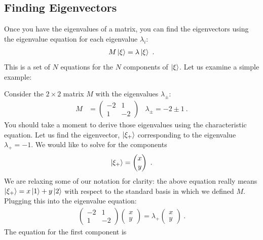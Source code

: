 \documentclass[12pt, oneside]{report}    %
\begin{document}
\subsection{Finding Eigenvectors}

Once you have the eigenvalues of a matrix, you can find the eigenvectors using the eigenvalue equation for each eigenvalue $\lambda_i$:
\begin{align}
    M\left|\xi\right\rangle = \lambda \left|\xi\right\rangle \ .
\end{align}
This is a set of $N$ equations for the $N$ components of $\left|\xi\right\rangle$. Let us examine a simple example:
\begin{example}
Consider the $2\times 2$ matrix $M$ with the eigenvalues $\lambda_\pm$:
\begin{align}
    M &=
    \begin{pmatrix}
        -2 & 1\\
        1 & -2
    \end{pmatrix}
    &
    \lambda_\pm = -2 \pm 1 \ .
\end{align}
You should take a moment to derive those eigenvalues using the characteristic equation. Let us find the eigenvector, $\left|\xi_+\right\rangle$ corresponding to the eigenvalue $\lambda_+ = -1$. We would like to solve for the components
\begin{align}
    \left|\xi_+\right\rangle
    =
    \begin{pmatrix}
        x\\y
    \end{pmatrix} \ .
\end{align}
We are relaxing some of our notation for clarity: the above equation really means $\left|\xi_+\right\rangle=x\left|1\right\rangle + y\left|2\right\rangle$ with respect to the standard basis in which we defined $M$. Plugging this into the eigenvalue equation:
\begin{align}
   \begin{pmatrix}
        -2 & 1\\
        1 & -2
    \end{pmatrix}
    \begin{pmatrix}
        x\\y
    \end{pmatrix}
    = 
    \lambda_+
    \begin{pmatrix}
        x\\y
    \end{pmatrix} \ .
    \label{eq:ex:eigenvector:finding:1}
\end{align}
The equation for the first component is
\begin{align}

\end{align}
\end{example}
\end{document}
